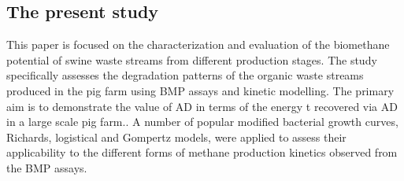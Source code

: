 \subsection{The present study}
This paper is focused on the characterization and evaluation of the biomethane potential of swine waste streams from different production stages. The study specifically assesses the degradation patterns of the organic waste streams produced in the pig farm using BMP assays and kinetic modelling. The primary aim is to demonstrate the value of AD in terms of the energy t recovered via AD in a large scale pig farm.. A number of popular modified bacterial growth curves, Richards, logistical and Gompertz models, were applied to assess their applicability to the different forms of methane production kinetics observed from the BMP assays.